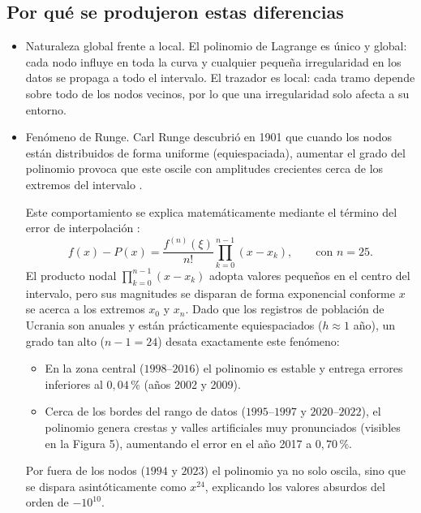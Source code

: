 \documentclass[11pt]{article}
\begin{document}
\subsection{Por qué se produjeron estas diferencias}
\begin{itemize}
    \item Naturaleza global frente a local. El polinomio de Lagrange es único y
    global: cada nodo influye en toda la curva y cualquier pequeña irregularidad en
    los datos se propaga a todo el intervalo. El trazador es local: cada tramo
    depende sobre todo de los nodos vecinos, por lo que una irregularidad solo
    afecta a su entorno.
    \item Fenómeno de Runge. Carl Runge descubrió en 1901 que cuando los nodos están distribuidos de forma uniforme (equiespaciada), aumentar el grado del polinomio provoca que este oscile con amplitudes crecientes cerca de los extremos del intervalo \cite{runge1901}.

Este comportamiento se explica matemáticamente mediante el término del error de interpolación \cite{burden}:
\[
f(x) - P(x) = \frac{f^{(n)}(\xi)}{n!} \prod_{k=0}^{n-1} (x - x_k), \qquad \text{con } n = 25.
\]
El producto nodal $\prod_{k=0}^{n-1} (x - x_k)$ adopta valores pequeños en el centro del intervalo, pero sus magnitudes se disparan de forma exponencial conforme $x$ se acerca a los extremos $x_0$ y $x_n$. Dado que los registros de población de Ucrania son anuales y están prácticamente equiespaciados ($h \approx 1$ año), un grado tan alto ($n-1 = 24$) desata exactamente este fenómeno:
\begin{itemize}
    \item En la zona central ($1998$--$2016$) el polinomio es estable y entrega errores inferiores al $0{,}04\,\%$ (años 2002 y 2009).
    \item Cerca de los bordes del rango de datos ($1995$--$1997$ y $2020$--$2022$), el polinomio genera crestas y valles artificiales muy pronunciados (visibles en la Figura 5), aumentando el error en el año 2017 a $0{,}70\,\%$.
\end{itemize}
Por fuera de los nodos ($1994$ y $2023$) el polinomio ya no solo oscila, sino que se dispara asintóticamente como $x^{24}$, explicando los valores absurdos del orden de $-10^{10}$.
    

\end{itemize}
\end{document}
